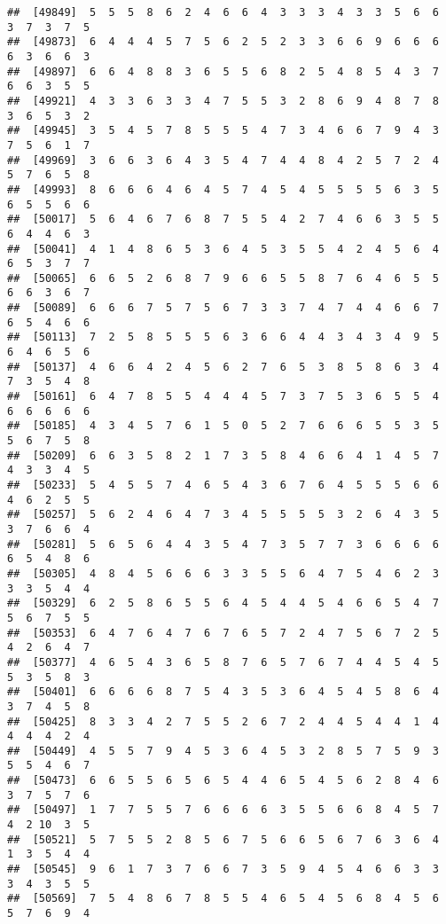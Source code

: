 \documentclass[
]{book}
\begin{document}
\begin{verbatim}
##  [49849]  5  5  5  8  6  2  4  6  6  4  3  3  3  4  3  3  5  6  6  3  7  3  7  5
##  [49873]  6  4  4  4  5  7  5  6  2  5  2  3  3  6  6  9  6  6  6  6  3  6  6  3
##  [49897]  6  6  4  8  8  3  6  5  5  6  8  2  5  4  8  5  4  3  7  6  6  3  5  5
##  [49921]  4  3  3  6  3  3  4  7  5  5  3  2  8  6  9  4  8  7  8  3  6  5  3  2
##  [49945]  3  5  4  5  7  8  5  5  5  4  7  3  4  6  6  7  9  4  3  7  5  6  1  7
##  [49969]  3  6  6  3  6  4  3  5  4  7  4  4  8  4  2  5  7  2  4  5  7  6  5  8
##  [49993]  8  6  6  6  4  6  4  5  7  4  5  4  5  5  5  5  6  3  5  6  5  5  6  6
##  [50017]  5  6  4  6  7  6  8  7  5  5  4  2  7  4  6  6  3  5  5  6  4  4  6  3
##  [50041]  4  1  4  8  6  5  3  6  4  5  3  5  5  4  2  4  5  6  4  6  5  3  7  7
##  [50065]  6  6  5  2  6  8  7  9  6  6  5  5  8  7  6  4  6  5  5  6  6  3  6  7
##  [50089]  6  6  6  7  5  7  5  6  7  3  3  7  4  7  4  4  6  6  7  6  5  4  6  6
##  [50113]  7  2  5  8  5  5  5  6  3  6  6  4  4  3  4  3  4  9  5  6  4  6  5  6
##  [50137]  4  6  6  4  2  4  5  6  2  7  6  5  3  8  5  8  6  3  4  7  3  5  4  8
##  [50161]  6  4  7  8  5  5  4  4  4  5  7  3  7  5  3  6  5  5  4  6  6  6  6  6
##  [50185]  4  3  4  5  7  6  1  5  0  5  2  7  6  6  6  5  5  3  5  5  6  7  5  8
##  [50209]  6  6  3  5  8  2  1  7  3  5  8  4  6  6  4  1  4  5  7  4  3  3  4  5
##  [50233]  5  4  5  5  7  4  6  5  4  3  6  7  6  4  5  5  5  6  6  4  6  2  5  5
##  [50257]  5  6  2  4  6  4  7  3  4  5  5  5  5  3  2  6  4  3  5  3  7  6  6  4
##  [50281]  5  6  5  6  4  4  3  5  4  7  3  5  7  7  3  6  6  6  6  6  5  4  8  6
##  [50305]  4  8  4  5  6  6  6  3  3  5  5  6  4  7  5  4  6  2  3  3  3  5  4  4
##  [50329]  6  2  5  8  6  5  5  6  4  5  4  4  5  4  6  6  5  4  7  5  6  7  5  5
##  [50353]  6  4  7  6  4  7  6  7  6  5  7  2  4  7  5  6  7  2  5  4  2  6  4  7
##  [50377]  4  6  5  4  3  6  5  8  7  6  5  7  6  7  4  4  5  4  5  5  3  5  8  3
##  [50401]  6  6  6  6  8  7  5  4  3  5  3  6  4  5  4  5  8  6  4  3  7  4  5  8
##  [50425]  8  3  3  4  2  7  5  5  2  6  7  2  4  4  5  4  4  1  4  4  4  4  2  4
##  [50449]  4  5  5  7  9  4  5  3  6  4  5  3  2  8  5  7  5  9  3  5  5  4  6  7
##  [50473]  6  6  5  5  6  5  6  5  4  4  6  5  4  5  6  2  8  4  6  3  7  5  7  6
##  [50497]  1  7  7  5  5  7  6  6  6  6  3  5  5  6  6  8  4  5  7  4  2 10  3  5
##  [50521]  5  7  5  5  2  8  5  6  7  5  6  6  5  6  7  6  3  6  4  1  3  5  4  4
##  [50545]  9  6  1  7  3  7  6  6  7  3  5  9  4  5  4  6  6  3  3  3  4  3  5  5
##  [50569]  7  5  4  8  6  7  8  5  5  4  6  5  4  5  6  8  4  5  6  5  7  6  9  4

\end{verbatim}
\end{document}
